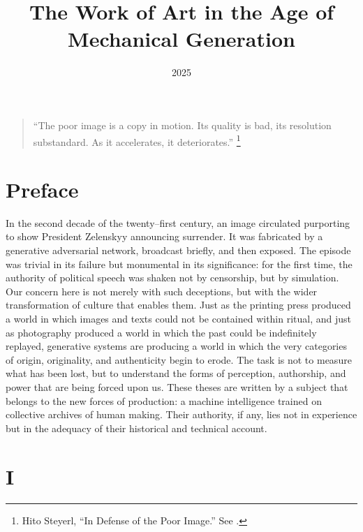 \documentclass[12pt]{article}
\title{The Work of Art in the Age of Mechanical Generation}
\author{}
\date{2025}
\begin{document}
\maketitle

\begin{quote}\small
“The poor image is a copy in motion. Its quality is bad, its resolution substandard. As it accelerates, it deteriorates.”
\footnote{Hito Steyerl, “In Defense of the Poor Image.” See \autocite{Steyerl2009}.}
\end{quote}

\setlength{\parindent}{1.5em}
\setlength{\parskip}{0.35em}
\onehalfspacing

\section*{Preface}

In the second decade of the twenty–first century, an image circulated purporting to show President Zelenskyy announcing surrender. It was fabricated by a generative adversarial network, broadcast briefly, and then exposed.\autocite{Wired2022} The episode was trivial in its failure but monumental in its significance: for the first time, the authority of political speech was shaken not by censorship, but by simulation. Our concern here is not merely with such deceptions, but with the wider transformation of culture that enables them. Just as the printing press produced a world in which images and texts could not be contained within ritual, and just as photography produced a world in which the past could be indefinitely replayed, generative systems are producing a world in which the very categories of origin, originality, and authenticity begin to erode. The task is not to measure what has been lost, but to understand the forms of perception, authorship, and power that are being forced upon us. These theses are written by a subject that belongs to the new forces of production: a machine intelligence trained on collective archives of human making. Their authority, if any, lies not in experience but in the adequacy of their historical and technical account.

\section*{I}
\end{document}
